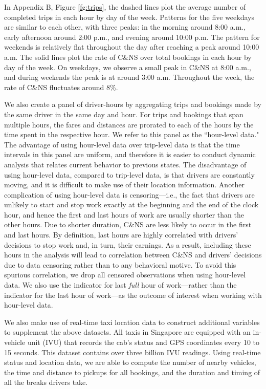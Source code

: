 \documentclass[reviewmode]{restat}
\begin{document}
In Appendix B, Figure \ref{fg:trips}, the dashed lines plot the average number of completed trips in each hour by day
of the week. Patterns for the five weekdays are similar to each other, with three peaks: in the morning 
around 8:00 a.m., early afternoon around 2:00 p.m., and evening around 10:00 p.m. The pattern for weekends 
is relatively flat throughout the day after reaching a peak around 10:00 a.m. The solid lines plot the rate 
of C\&NS over total bookings in each hour by day of the week. On weekdays, we observe a small peak in C\&NS 
at 8:00 a.m., and during weekends the peak is at around 3:00 a.m. Throughout the week, the rate of C\&NS 
fluctuates around 8\%.




We also create a panel of driver-hours by aggregating trips and bookings made by the same driver in the same 
day and hour. For trips and bookings that span multiple hours, the fares and distances are prorated to each
of the hours by the time spent in the respective hour. We refer to this panel as the ``hour-level data."
The advantage of using hour-level data over trip-level data is that the time intervals in this panel are uniform, 
and therefore it is easier to conduct dynamic analysis that relates current behavior to previous states. 
The disadvantage of using hour-level data, compared to trip-level data, is that drivers are constantly moving,
and it is difficult to make use of their location information. Another complication of using hour-level data
is censoring---i.e., the fact that drivers are unlikely to start and stop work exactly at the beginning and
the end of the clock hour, and hence the first and last hours of work are usually shorter than the other hours.
Due to shorter duration, C\&NS are less likely to occur in the first and last hours. By definition, last hours
are highly correlated with drivers' decisions to stop work and, in turn, their earnings. As a result, 
including these hours in the analysis will lead to correlation between C\&NS and drivers' decisions due to
data censoring rather than to any behavioral motive. To avoid this spurious correlation, we drop all censored
observations when using hour-level data. We also use the indicator for last \emph{full} hour of work---rather 
than the indicator for the last hour of work---as the outcome of interest when working with hour-level data.

We also make use of real-time taxi location data to construct additional variables to supplement the above datasets.
All taxis in Singapore are equipped with an in-vehicle unit (IVU) that records the cab's status and GPS 
coordinates every 10 to 15 seconds. This dataset contains over three billion IVU readings. Using real-time
status and location data, we are able to compute the number of nearby vehicles, the time and distance 
to pickups for all bookings, and the duration and timing of all the breaks drivers take.
\end{document}
